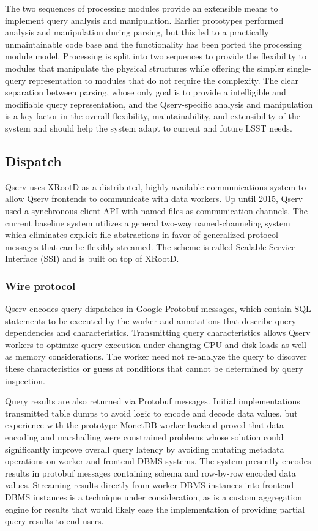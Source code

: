 \documentclass[DM,lsstdraft,toc]{lsstdoc}
\begin{document}
The two sequences of processing modules provide an extensible means to
implement query analysis and manipulation. Earlier prototypes performed
analysis and manipulation during parsing, but this led to a practically
unmaintainable code base and the functionality has been ported the
processing module model. Processing is split into two sequences to
provide the flexibility to modules that manipulate the physical
structures while offering the simpler single-query representation to
modules that do not require the complexity. The clear separation between
parsing, whose only goal is to provide a intelligible and modifiable
query representation, and the Qserv-specific analysis and manipulation
is a key factor in the overall flexibility, maintainability, and
extensibility of the system and should help the system adapt to current
and future LSST needs.

\subsection{Dispatch}\label{dispatch}

Qserv uses XRootD as a distributed, highly-available communications system to
allow Qserv frontends to communicate with data workers. Up until 2015, Qserv
used a synchronous client API with named files as communication channels. The
current baseline system utilizes a general two-way named-channeling system
which eliminates explicit file abstractions in favor of generalized protocol
messages that can be flexibly streamed. The scheme is called Scalable Service
Interface (SSI) and is built on top of XRootD.

\subsubsection{Wire protocol}\label{wire-protocol}

Qserv encodes query dispatches in Google Protobuf messages, which contain SQL
statements to be executed by the worker and annotations that describe query
dependencies and characteristics. Transmitting query characteristics allows
Qserv workers to optimize query execution under changing CPU and disk loads as
well as memory considerations. The worker need not re-analyze the query to
discover these characteristics or guess at conditions that cannot be
determined by query inspection.

Query results are also returned via Protobuf messages. Initial implementations
transmitted table dumps to avoid logic to encode and decode data values, but
experience with the prototype MonetDB worker backend proved that data encoding
and marshalling were constrained problems whose solution could significantly
improve overall query latency by avoiding mutating metadata operations on
worker and frontend DBMS systems.  The system presently encodes results in
protobuf messages containing schema and row-by-row encoded data values.
Streaming results directly from worker DBMS instances into frontend DBMS
instances is a technique under consideration, as is a custom aggregation
engine for results that would likely ease the implementation of providing
partial query results to end users.
\end{document}
